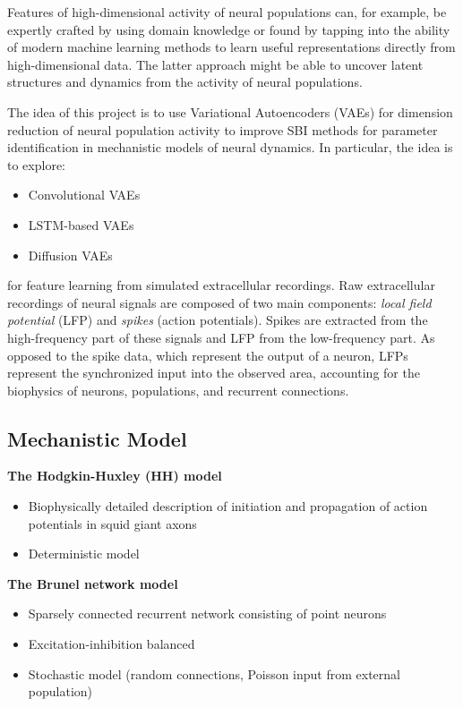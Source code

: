 Features of high-dimensional activity of neural populations can, for example, be expertly crafted by using domain knowledge or found by tapping into the ability of modern machine learning methods to learn useful representations directly from high-dimensional data. The latter approach might be able to uncover latent structures and dynamics from the activity of neural populations.

The idea of this project is to use Variational Autoencoders (VAEs) for dimension reduction of neural population activity to improve SBI methods for parameter identification in mechanistic models of neural dynamics. In particular, the idea is to explore:

\begin{itemize}
    \item Convolutional VAEs
    \item LSTM-based VAEs
    \item Diffusion VAEs
\end{itemize}


for feature learning from simulated extracellular recordings. Raw extracellular recordings of neural signals are composed of two main components: \textit{local field potential} (LFP) and \textit{spikes} (action potentials). Spikes are extracted from the high-frequency part of these signals and LFP from the low-frequency part. As opposed to the spike data, which represent the output of a neuron, LFPs represent the synchronized input into the observed area, accounting for the biophysics of neurons, populations, and recurrent connections.



\subsection{Mechanistic Model}

\textbf{The Hodgkin-Huxley (HH) model}

\begin{itemize}
    \item Biophysically detailed description of initiation and propagation of action potentials in squid giant axons
    \item Deterministic model
\end{itemize}

\textbf{The Brunel network model}

\begin{itemize}
    \item Sparsely connected recurrent network consisting of point neurons
    \item Excitation-inhibition balanced
    \item Stochastic model (random connections, Poisson input from external population)
\end{itemize}
    
